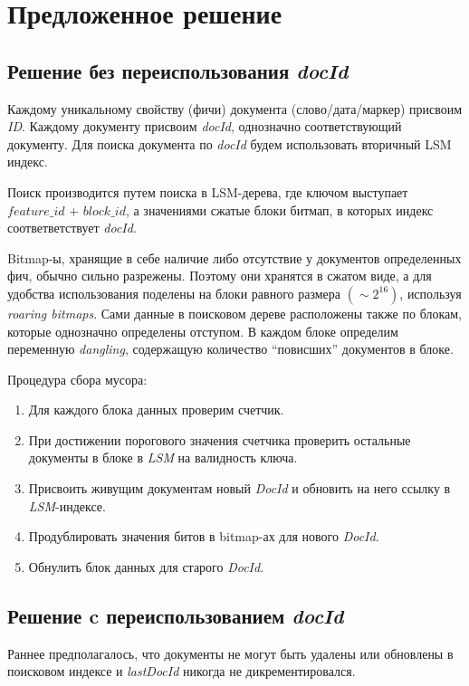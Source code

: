 \newpage
\section{Предложенное решение}

\subsection{Решение без переиспользования \textit{docId}}

Каждому уникальному свойству (фичи) документа (слово/дата/маркер) присвоим
\textit{ID}. Каждому документу присвоим \textit{docId}, однозначно
соответствующий документу. Для поиска документа по \textit{docId} будем
использовать вторичный LSM индекс.

Поиск производится путем поиска в LSM-дерева, где ключом выступает
$feature\_id$ + $block\_id$, а значениями сжатые блоки битмап, в
которых индекс соответветствует \textit{docId}.

Bitmap-ы, хранящие в себе наличие либо отсутствие у документов определенных фич,
обычно сильно разрежены. Поэтому они хранятся в сжатом виде, а для удобства
использования поделены на блоки равного размера $(\sim 2^{16})$, используя
\textit{roaring bitmaps}. Сами данные в поисковом дереве расположены также по
блокам, которые однозначно определены отступом. В каждом блоке определим
переменную \textit{dangling}, содержащую количество “повисших” документов в
блоке. 

Процедура сбора мусора:
\begin{enumerate}
    \item Для каждого блока данных проверим счетчик.
    \item При достижении порогового значения счетчика проверить остальные
    документы в блоке в \textit{LSM} на валидность ключа.
    \item Присвоить живущим документам новый \textit{DocId} и обновить на него
    ссылку в \textit{LSM}-индексе.
    \item Продублировать значения битов в bitmap-ах для нового \textit{DocId}.
    \item Обнулить блок данных для старого \textit{DocId}.
\end{enumerate}

\subsection{Решение c переиспользованием \textit{docId}}

Раннее предполагалось, что документы не могут быть удалены или обновлены в
поисковом индексе и \textit{lastDocId}
никогда не дикрементировался.


